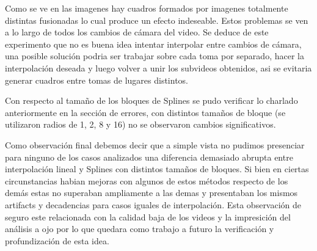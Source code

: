 Como se ve en las imagenes hay cuadros formados por imagenes totalmente distintas fusionadas lo cual produce un efecto indeseable. Estos problemas se ven a lo largo de todos los cambios de cámara del video. Se deduce de este experimento que no es buena idea intentar interpolar entre cambios de cámara, una posible solución podria ser trabajar sobre cada toma por separado, hacer la interpolación deseada y luego volver a unir los subvideos obtenidos, asi se evitaria generar cuadros entre tomas de lugares distintos.

Con respecto al tamaño de los bloques de Splines se pudo verificar lo charlado anteriormente en la sección de errores, con distintos tamaños de bloque (se utilizaron radios de 1, 2, 8 y 16) no se observaron cambios significativos.

Como observación final debemos decir que a simple vista no pudimos presenciar para ninguno de los casos analizados una diferencia demasiado abrupta entre interpolación lineal y Splines con distintos tamaños de bloques. Si bien en ciertas circunstancias habian mejoras con algunos de estos métodos respecto de los demás estas no superaban ampliamente a las demas y presentaban los mismos artifacts y decadencias para casos iguales de interpolación. Esta observación de seguro este relacionada con la calidad baja de los videos y la impresición del análisis a ojo por lo que quedara como trabajo a futuro la verificación y profundización de esta idea.